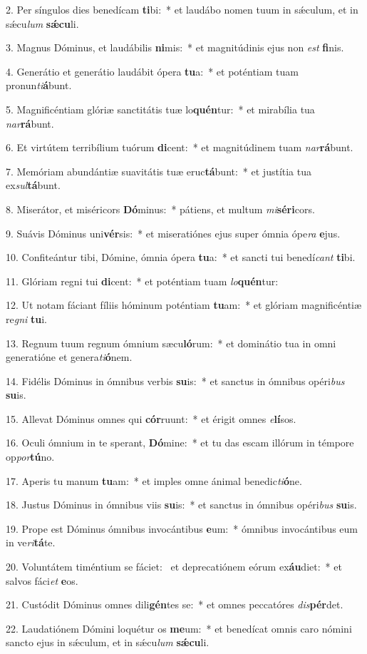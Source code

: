 2. Per síngulos dies benedícam \textbf{ti}bi:~*  et laudábo nomen tuum in sǽculum, et in sǽcu\textit{lum} \textbf{sǽ}\textbf{cu}li.\

3. Magnus Dóminus, et laudábilis \textbf{ni}mis:~*  et magnitúdinis ejus non \textit{est} \textbf{fi}nis.\

4. Generátio et generátio laudábit ópera \textbf{tu}a:~*  et poténtiam tuam pronun\textit{ti}\textbf{á}bunt.\

5. Magnificéntiam glóriæ sanctitátis tuæ lo\textbf{quén}tur:~*  et mirabília tua \textit{nar}\textbf{rá}bunt.\

6. Et virtútem terribílium tuórum \textbf{di}cent:~*  et magnitúdinem tuam \textit{nar}\textbf{rá}bunt.\

7. Memóriam abundántiæ suavitátis tuæ eruc\textbf{tá}bunt:~*  et justítia tua ex\textit{sul}\textbf{tá}bunt.\

8. Miserátor, et miséricors \textbf{Dó}minus:~*  pátiens, et multum \textit{mi}\textbf{sé}\textbf{ri}cors.\

9. Suávis Dóminus uni\textbf{vér}sis:~*  et miseratiónes ejus super ómnia ópe\textit{ra} \textbf{e}jus.\

10. Confiteántur tibi, Dómine, ómnia ópera \textbf{tu}a:~*  et sancti tui benedí\textit{cant} \textbf{ti}bi.\

11. Glóriam regni tui \textbf{di}cent:~*  et poténtiam tuam \textit{lo}\textbf{quén}tur:\

12. Ut notam fáciant fíliis hóminum poténtiam \textbf{tu}am:~*  et glóriam magnificéntiæ re\textit{gni} \textbf{tu}i.\

13. Regnum tuum regnum ómnium sæcu\textbf{ló}rum:~*  et dominátio tua in omni generatióne et genera\textit{ti}\textbf{ó}nem.\

14. Fidélis Dóminus in ómnibus verbis \textbf{su}is:~*  et sanctus in ómnibus opéri\textit{bus} \textbf{su}is.\

15. Allevat Dóminus omnes qui \textbf{cór}ruunt:~*  et érigit omnes \textit{e}\textbf{lí}sos.\

16. Oculi ómnium in te sperant, \textbf{Dó}mine:~*  et tu das escam illórum in témpore op\textit{por}\textbf{tú}no.\

17. Aperis tu manum \textbf{tu}am:~*  et imples omne ánimal benedic\textit{ti}\textbf{ó}ne.\

18. Justus Dóminus in ómnibus viis \textbf{su}is:~*  et sanctus in ómnibus opéri\textit{bus} \textbf{su}is.\

19. Prope est Dóminus ómnibus invocántibus \textbf{e}um:~*  ómnibus invocántibus eum in ve\textit{ri}\textbf{tá}te.\

20. Voluntátem timéntium se fáciet: \dag\  et deprecatiónem eórum ex\textbf{áu}diet:~*  et salvos fáci\textit{et} \textbf{e}os.\

21. Custódit Dóminus omnes dili\textbf{gén}tes se:~*  et omnes peccatóres \textit{dis}\textbf{pér}det.\

22. Laudatiónem Dómini loquétur os \textbf{me}um:~*  et benedícat omnis caro nómini sancto ejus in sǽculum, et in sǽcu\textit{lum} \textbf{sǽ}\textbf{cu}li.\

